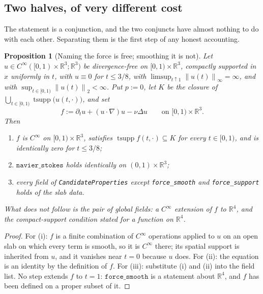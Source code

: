 \documentclass[11pt]{article}
\newcommand{\R}{\mathbb{R}}
\newcommand{\norm}[1]{\left\lVert #1\right\rVert}
\newcommand{\supp}{\operatorname{tsupp}}
\newcommand{\ct}[1]{\texttt{#1}}
\theoremstyle{plain}
\newtheorem{proposition}[theorem]{Proposition}
\theoremstyle{definition}
\theoremstyle{remark}
\begin{document}
\subsection{Two halves, of very different cost}
\label{sec:twohalves}

The statement is a conjunction, and the two conjuncts have almost nothing to do
with each other. Separating them is the first step of any honest accounting.

\begin{proposition}[Naming the force is free; smoothing it is not]
\label{prop:free}
Let $u\in C^\infty([0,1)\times\R^3;\R^3)$ be divergence-free on
$[0,1)\times\R^3$, compactly supported in $x$ uniformly in $t$, with
$u\equiv0$ for $t\le3/8$, with
$\limsup_{t\uparrow1}\norm{u(t)}_\infty=\infty$, and with
$\sup_{t\in[0,1)}\norm{u(t)}_2<\infty$. Put $p:=0$, let $K$ be the closure of
$\bigcup_{t\in[0,1)}\supp\bigl(u(t,\cdot)\bigr)$, and set
\[
  f:=\partial_t u+(u\cdot\nabla)u-\nu\Delta u
  \qquad\text{on }[0,1)\times\R^3 .
\]
Then
\begin{enumerate}
\item[(i)] $f$ is $C^\infty$ on $[0,1)\times\R^3$, satisfies
$\supp f(t,\cdot)\subseteq K$ for every $t\in[0,1)$, and is identically zero
for $t\le3/8$;
\item[(ii)] $\ct{navier\_stokes}$ holds identically on $(0,1)\times\R^3$;
\item[(iii)] every field of \ct{CandidateProperties} except
\ct{force\_smooth} and \ct{force\_support} holds of the slab data.
\end{enumerate}
What does \emph{not} follow is the pair of global fields: a $C^\infty$
extension of $f$ to $\R^4$, and the compact-support condition stated for a
function on $\R^4$.
\end{proposition}

\begin{proof}
For (i): $f$ is a finite combination of $C^\infty$ operations applied to $u$
on an open slab on which every term is smooth, so it is $C^\infty$ there; its
spatial support is inherited from $u$, and it vanishes near $t=0$ because $u$
does. For (ii): the equation is an identity by the definition of $f$. For
(iii): substitute (i) and (ii) into the field list. No step extends $f$ to
$t=1$: $\ct{force\_smooth}$ is a statement about $\R^4$, and $f$ has been
defined on a proper subset of it.
\end{proof}
\end{document}
